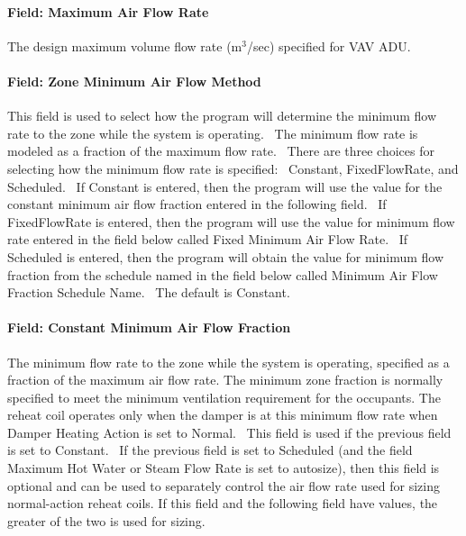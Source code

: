 \paragraph{Field: Maximum Air Flow Rate}\label{field-maximum-air-flow-rate-2}

The design maximum volume flow rate (m\(^{3}\)/sec) specified for VAV ADU.

\paragraph{Field: Zone Minimum Air Flow Method}\label{field-zone-minimum-air-flow-method}

This field is used to select how the program will determine the minimum flow rate to the zone while the system is operating.~ The minimum flow rate is modeled as a fraction of the maximum flow rate.~ There are three choices for selecting how the minimum flow rate is specified:~ Constant, FixedFlowRate, and Scheduled.~ If Constant is entered, then the program will use the value for the constant minimum air flow fraction entered in the following field.~ If FixedFlowRate is entered, then the program will use the value for minimum flow rate entered in the field below called Fixed Minimum Air Flow Rate.~ If Scheduled is entered, then the program will obtain the value for minimum flow fraction from the schedule named in the field below called Minimum Air Flow Fraction Schedule Name.~ The default is Constant.

\paragraph{Field: Constant Minimum Air Flow Fraction}\label{field-constant-minimum-air-flow-fraction}

The minimum flow rate to the zone while the system is operating, specified as a fraction of the maximum air flow rate. The minimum zone fraction is normally specified to meet the minimum ventilation requirement for the occupants. The reheat coil operates only when the damper is at this minimum flow rate when Damper Heating Action is set to Normal.~ This field is used if the previous field is set to Constant.~ If the previous field is set to Scheduled (and the field Maximum Hot Water or Steam Flow Rate is set to autosize), then this field is optional and can be used to separately control the air flow rate used for sizing normal-action reheat coils. If this field and the following field have values, the greater of the two is used for sizing.

